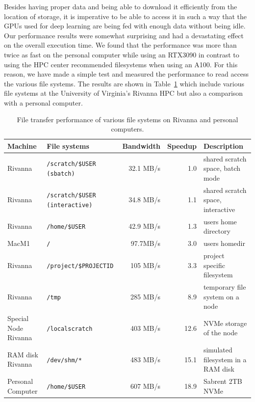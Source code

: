\documentclass[utf8]{FrontiersinVancouver} %
\begin{document}
Besides having proper data and being able to download it efficiently from the location of storage, it is imperative to be able to access it in such a way that the GPUs used for deep learning are being fed with enough data without being idle. Our performance results were somewhat surprising and had a devastating effect on the overall execution time. We found that the performance was more than twice as fast on the personal computer while using an RTX3090 in contrast to using the HPC center recommended filesystems when using an A100. For this reason, we have made a simple test and measured the performance to read access the various file systems. The results are shown in Table~\ref{tab:file-performance} which include various file systems at the University of Virginia's Rivanna HPC but also a comparison with a personal computer.

\begin{table}
  \caption{File transfer performance of various file systems on Rivanna and personal computers.}
  \label{tab:file-performance}
  \begin{center}
 {\footnotesize 
    \begin{tabular}{|llrrp{4.5cm}|}
      \hline
    Machine & File systems & Bandwidth & Speedup & Description \\
    \hline
    \hline
    Rivanna & \verb|/scratch/$USER  (sbatch)|     &  32.1 MB/s  & 1.0 & shared scratch space, batch mode \\
    Rivanna & \verb|/scratch/$USER (interactive)| &  34.8 MB/s  & 1.1 & shared scratch space, interactive \\
    Rivanna & \verb|/home/$USER|                    & 42.9 MB/s  & 1.3 & users home directory \\
    MacM1   & \verb|/| &  97.7MB/s & 3.0 & users homedir \\
    Rivanna & \verb|/project/$PROJECTID |     &  105 MB/s  & 3.3 & project specific filesystem \\
    Rivanna & \verb|/tmp|                         &  285 MB/s  & 8.9 & temporary file system on a node \\
    Special Node Rivanna & \verb|/localscratch|  &  403 MB/s  & 12.6 & NVMe storage of the node\\
    RAM disk Rivanna  & \verb|/dev/shm/*|      &    483 MB/s  & 15.1 & simulated filesystem in a RAM disk\\
    Personal Computer & \verb|/home/$USER| &  607 MB/s &  18.9 & Sabrent 2TB NVMe\\
    \hline
    \end{tabular}
  }
    \end{center}
\end{table}
  
\end{document}
